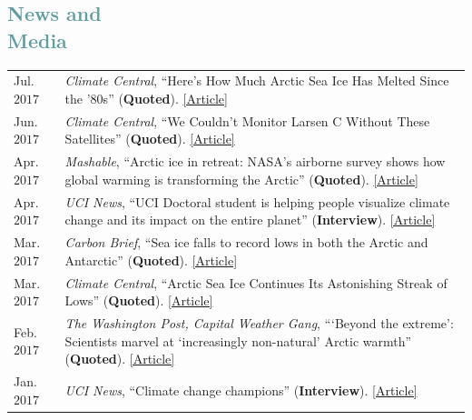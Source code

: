 \documentclass[margin,line,palatino,courier,10pt]{res}
\begin{document}
\begin{resume}
\section{\sc \textcolor{CadetBlue}{\large{News and\\ Media}}}
\vspace*{0.04in}
\begin{tabular}{@{}p{0.8in}p{4in}}
Jul. $2017$ & \textit{Climate Central}, ``Here's How Much Arctic Sea Ice Has Melted Since the '$80$s'' (\textbf{Quoted}). \href{http://www.climatecentral.org/news/arctic-sea-ice-melt-since-the-80s-21637}{[Article]}\\
Jun. $2017$ & \textit{Climate Central}, ``We Couldn't Monitor Larsen C Without These Satellites'' (\textbf{Quoted}). \href{http://www.climatecentral.org/news/larsen-c-monitoring-satellites-21564}{[Article]}\\
Apr. $2017$ & \textit{Mashable}, ``Arctic ice in retreat: NASA's airborne survey shows how global warming is transforming the Arctic'' (\textbf{Quoted}). \href{http://mashable.com/2017/04/13/arctic-meltdown-nasa-photos-changing-ice/?utm_cid=hp-n-1#BgdepWyM6Pq3}{[Article]}\\
Apr. $2017$ & \textit{UCI News}, ``UCI Doctoral student is helping people visualize climate change and its impact on the entire planet'' (\textbf{Interview}). \href{http://grad.uci.edu/news-and-events/student-spotlights/Zachary-Labe.html}{[Article]}\\
Mar. $2017$ & \textit{Carbon Brief}, ``Sea ice falls to record lows in both the Arctic and Antarctic'' (\textbf{Quoted}). \href{https://www.carbonbrief.org/sea-ice-falls-record-lows-arctic-antarctic}{[Article]}\\
Mar. $2017$ & \textit{Climate Central}, ``Arctic Sea Ice Continues Its Astonishing Streak of Lows'' (\textbf{Quoted}). \href{http://www.climatecentral.org/news/arctic-sea-ice-record-low-streak-21227}{[Article]}\\
Feb. $2017$ & \textit{The Washington Post, Capital Weather Gang}, ```Beyond the extreme': Scientists marvel at `increasingly non-natural' Arctic warmth'' (\textbf{Quoted}). \href{https://www.washingtonpost.com/news/capital-weather-gang/wp/2017/02/01/beyond-the-extreme-scientists-marvel-at-increasingly-non-natural-arctic-warmth/?sdfsdfsdfsdfsd&utm_term=.cf3cf81d24f3}{[Article]}\\
Jan. $2017$ & \textit{UCI News}, ``Climate change champions'' (\textbf{Interview}). \href{https://news.uci.edu/climate-change-champions/}{[Article]}\\

\end{tabular}
\end{resume}
\end{document}
